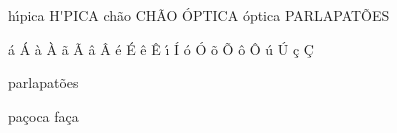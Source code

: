 h\'{\i}pica
H\'{\I}PICA
ch\~ao
CH\~AO
\'OPTICA
\'optica
PARLAPAT\~OES

\'a
\'A
\`a
\`A
\~a
\~A
\^a
\^A
\'e
\'E
\^e
\^E
\'{\i}
\'I
\'o
\'O
\~o
\~O
\^o
\^O
\'u
\'U
\c{c}
\c{C}

parlapat\~oes


pa\c{c}oca
fa\c{c}a



